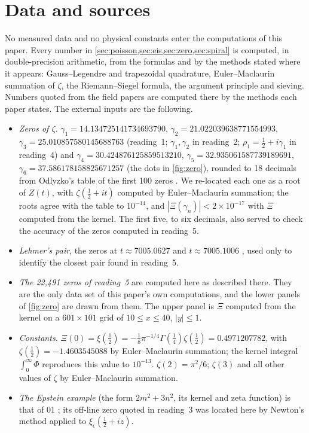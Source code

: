 \documentclass[11pt]{article}
\theoremstyle{definition}\newtheorem{definition}[theorem]{Definition}
\theoremstyle{remark}\newtheorem{remark}[theorem]{Remark}
\begin{document}
\section{Data and sources}\label{sec:data}
No measured data and no physical constants enter the computations of this paper. Every number in \cref{sec:poisson,sec:eis,sec:zero,sec:spiral} is computed, in double-precision arithmetic, from the formulas and by the methods stated where it appears: Gauss--Legendre and trapezoidal quadrature, Euler--Maclaurin summation of $\zeta$, the Riemann--Siegel formula, the argument principle and sieving. Numbers quoted from the field papers are computed there by the methods each paper states. The external inputs are the following.
\begin{itemize}
\item \emph{Zeros of $\zeta$.} $\gamma_1=14.134725141734693790$, $\gamma_2=21.022039638771554993$, $\gamma_3=25.010857580145688763$ (reading~1; $\gamma_1,\gamma_2$ in reading~2; $\rho_1=\frac12+i\gamma_1$ in reading~4) and $\gamma_4=30.424876125859513210$, $\gamma_5=32.935061587739189691$, $\gamma_6=37.586178158825671257$ (the dots in \cref{fig:zero}), rounded to 18 decimals from Odlyzko's table of the first 100 zeros \cite{OdlyzkoTables}. We re-located each one as a root of $Z(t)$, with $\zeta(\frac12+it)$ computed by Euler--Maclaurin summation; the roots agree with the table to $10^{-14}$, and $|\Xi(\gamma_n)|<2\times10^{-17}$ with $\Xi$ computed from the kernel. The first five, to six decimals, also served to check the accuracy of the zeros computed in reading~5.
\item \emph{Lehmer's pair}, the zeros at $t\approx7005.0627$ and $t\approx7005.1006$ \cite{Lehmer}, used only to identify the closest pair found in reading~5.
\item \emph{The 22{,}491 zeros of reading~5} are computed here as described there. They are the only data set of this paper's own computations, and the lower panels of \cref{fig:zero} are drawn from them. The upper panel is $\Xi$ computed from the kernel on a $601\times101$ grid of $10\le x\le40$, $|y|\le1$.
\item \emph{Constants.} $\Xi(0)=\xi(\frac12)=-\frac18\pi^{-1/4}\Gamma(\frac14)\zeta(\frac12)=0.4971207782$, with $\zeta(\frac12)=-1.4603545088$ by Euler--Maclaurin summation; the kernel integral $\int_0^\infty\Phi$ reproduces this value to $10^{-13}$. $\zeta(2)=\pi^2/6$; $\zeta(3)$ and all other values of $\zeta$ by Euler--Maclaurin summation.
\item \emph{The Epstein example} (the form $2m^2+3n^2$, its kernel and zeta function) is that of 01 \cite{SMath}; its off-line zero quoted in reading~3 was located here by Newton's method applied to $\xi_\epsilon(\frac12+iz)$.

\end{itemize}
\end{document}
